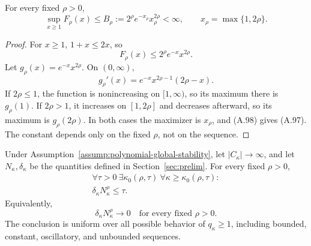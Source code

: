 \begin{lemma}
\label{lem:step-005-x-supremum}
For every fixed \(\rho>0\),
\[
\sup_{x\geq1}F_\rho(x)
\leq
B_\rho
:=
2^\rho e^{-x_\rho}x_\rho^{2\rho}
<\infty,
\qquad
x_\rho=\max\{1,2\rho\}.
\tag{A.97}
\]
\end{lemma}

\begin{proof}
For \(x\geq1\), \(1+x\leq2x\), so
\[
F_\rho(x)\leq2^\rho e^{-x}x^{2\rho}.
\tag{A.98}
\]
Let \(g_\rho(x)=e^{-x}x^{2\rho}\).  On \((0,\infty)\),
\[
g_\rho'(x)
=e^{-x}x^{2\rho-1}(2\rho-x).
\tag{A.99}
\]
If \(2\rho\leq1\), the function is nonincreasing on
\([1,\infty)\), so its maximum there is \(g_\rho(1)\).  If
\(2\rho>1\), it increases on \([1,2\rho]\) and decreases afterward,
so its maximum is \(g_\rho(2\rho)\).  In both cases the maximizer is
\(x_\rho\), and (A.98) gives (A.97).  The constant depends only on
the fixed \(\rho\), not on the sequence.
\end{proof}

\begin{proposition}
\label{prop:step-005-privacy-negligibility}
Under Assumption~\ref{assump:polynomial-global-stability}, let
\(|C_\kappa|\to\infty\), and let \(N_\kappa,\delta_\kappa\) be the
quantities defined in Section~\ref{sec:prelim}.  For every fixed
\(\rho>0\),
\[
\begin{gathered}
\forall\tau>0\ \exists\kappa_0(\rho,\tau)\
\forall\kappa\geq\kappa_0(\rho,\tau):\\
\delta_\kappa N_\kappa^\rho\leq\tau.
\end{gathered}
\tag{A.100}
\]
Equivalently,
\[
\delta_\kappa N_\kappa^\rho\longrightarrow0
\quad\text{for every fixed }\rho>0.
\tag{A.101}
\]
The conclusion is uniform over all possible behavior of
\(q_\kappa\geq1\), including bounded, constant, oscillatory, and
unbounded sequences.
\end{proposition}

